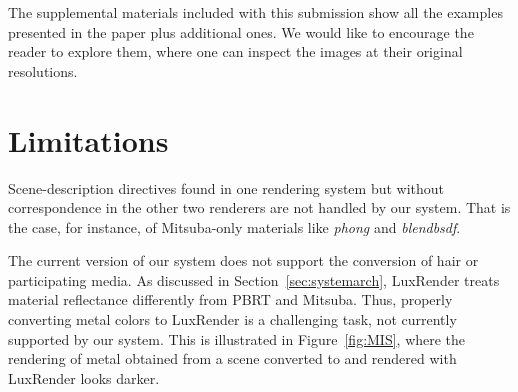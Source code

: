The supplemental materials included with this submission show all the examples presented in the paper plus additional ones. We would like to encourage the reader to explore them, where one can inspect the images at their original resolutions.

\section{Limitations}
Scene-description directives found in one rendering system but without correspondence in the other two renderers are not handled by our system. That is the case, for instance, of Mitsuba-only materials like \textit{phong} and \textit{blendbsdf}. 

The current version of our system does not support the conversion of hair or participating media. As discussed in Section~\ref{sec:systemarch}, LuxRender treats material reflectance differently from PBRT and Mitsuba. Thus, properly converting metal colors to LuxRender is a challenging task, not currently supported by our system. This is illustrated in Figure~\ref{fig:MIS}, where the rendering of metal obtained from a scene converted to and rendered with LuxRender looks darker.  

